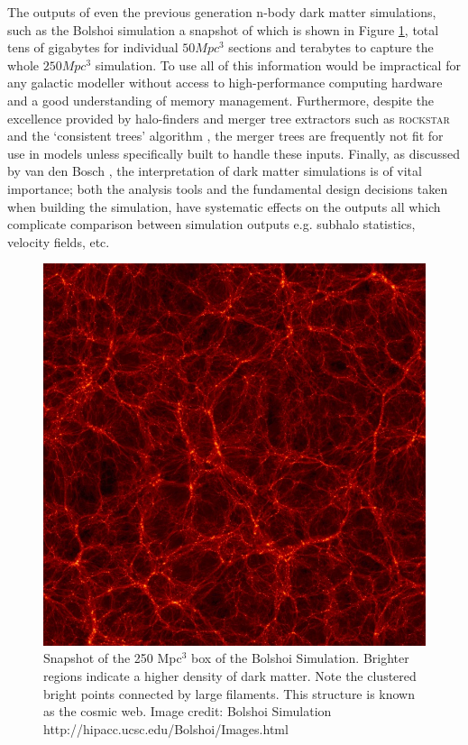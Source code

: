 The outputs of even the previous generation n-body dark matter simulations, such as the Bolshoi simulation a snapshot of which is shown in Figure \ref{fig:Bolshoi}, total tens of gigabytes for individual $50 Mpc^3$ sections and terabytes to capture the whole $250 Mpc^3$ simulation. To use all of this information would be impractical for any galactic modeller without access to high-performance computing hardware and a good understanding of memory management. Furthermore, despite the excellence provided by halo-finders and merger tree extractors such as \textsc{rockstar} \cite{Behroozi2011TheCores} and the `consistent trees' algorithm \cite{Behroozi2013GRAVITATIONALLYCOSMOLOGY}, the merger trees are frequently not fit for use in models unless specifically built to handle these inputs. Finally, as discussed by van den Bosch \cite{vandenBosch2014ComingWells, vandenBosch2017DissectingSimulation, vandenBosch2018DisruptionFiction}, the interpretation of dark matter simulations is of vital importance; both the analysis tools and the fundamental design decisions taken when building the simulation, have systematic effects on the outputs all which complicate comparison between simulation outputs e.g. subhalo statistics, velocity fields, etc.

\begin{figure}[h]
    \centering
    \includegraphics[width = \linewidth]{Figures/Chapter2/Bolshoi.jpg}
    \caption{Snapshot of the 250 Mpc$^3$ box of the Bolshoi Simulation. Brighter regions indicate a higher density of dark matter. Note the clustered bright points connected by large filaments. This structure is known as the cosmic web.
    Image credit: Bolshoi Simulation http://hipacc.ucsc.edu/Bolshoi/Images.html}
    \label{fig:Bolshoi}
\end{figure}

